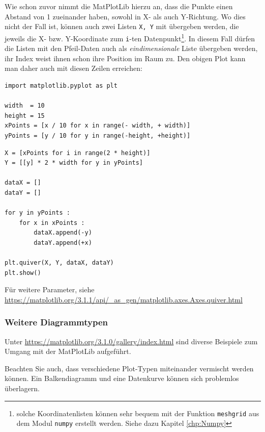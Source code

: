 \label{ssc:vecFields}
Wie schon zuvor nimmt die MatPlotLib hierzu an, dass die Punkte einen Abstand von 1 zueinander haben, sowohl in X- als auch Y-Richtung. Wo dies nicht der Fall ist, können auch zwei Listen \texttt{X, Y} mit übergeben werden, die jeweils die X- bzw. Y-Koordinate zum \texttt{i}-ten Datenpunkt\footnote{solche Koordinatenlisten können sehr bequem mit der Funktion \texttt{meshgrid} aus dem Modul \texttt{numpy} erstellt werden. Siehe dazu Kapitel \ref{chp:Numpy}}. In diesem Fall dürfen die Listen mit den Pfeil-Daten auch als \emph{eindimensionale} Liste übergeben werden, \ie ihr Index weist ihnen schon ihre Position im Raum zu. Den obigen Plot kann man daher auch mit diesen Zeilen erreichen:

\begin{codebox}
\begin{verbatim}
import matplotlib.pyplot as plt

width  = 10
height = 15
xPoints = [x / 10 for x in range(- width, + width)]
yPoints = [y / 10 for y in range(-height, +height)]
\end{verbatim}
\end{codebox}
%
\begin{codebox}[]
\begin{verbatim}
X = [xPoints for i in range(2 * height)]
Y = [[y] * 2 * width for y in yPoints]

dataX = []
dataY = []

for y in yPoints :
    for x in xPoints :
        dataX.append(-y)
        dataY.append(+x)

plt.quiver(X, Y, dataX, dataY)
plt.show()
\end{verbatim}
\end{codebox}

Für weitere Parameter, siehe \url{https://matplotlib.org/3.1.1/api/_as_gen/matplotlib.axes.Axes.quiver.html}

\subsubsection{Weitere Diagrammtypen}
Unter \url{https://matplotlib.org/3.1.0/gallery/index.html} sind diverse Beispiele zum Umgang mit der MatPlotLib aufgeführt.

Beachten Sie auch, dass verschiedene Plot-Typen miteinander vermischt werden können. Ein Balkendiagramm und eine Datenkurve können sich problemlos überlagern.

